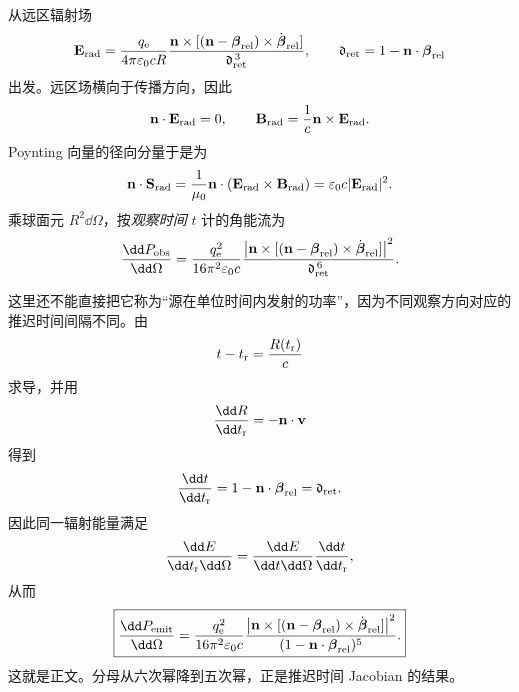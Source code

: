 \begin{derivation}[远区角通量积分与总辐射功率]

从远区辐射场
\[
\mathbf E_{\rm rad}
=
\frac{q_{\mathrm e}}{4\pi\varepsilon_0cR}
\frac{
\mathbf n\times[
(\mathbf n-\boldsymbol\beta_{\rm rel})
\times\dot{\boldsymbol\beta}_{\rm rel}]
}
{\mathfrak d_{\rm ret}^{\,3}},
\qquad
\mathfrak d_{\rm ret}
=
1-\mathbf n\cdot\boldsymbol\beta_{\rm rel}
\]
出发。远区场横向于传播方向，因此
\[
\mathbf n\cdot\mathbf E_{\rm rad}=0,
\qquad
\mathbf B_{\rm rad}
=
\frac1c\mathbf n\times\mathbf E_{\rm rad}.
\]
Poynting 向量的径向分量于是为
\[
\mathbf n\cdot\mathbf S_{\rm rad}
=
\frac1{\mu_0}
\mathbf n\cdot
(\mathbf E_{\rm rad}\times\mathbf B_{\rm rad})
=
\varepsilon_0c|\mathbf E_{\rm rad}|^2.
\]
乘球面元 \(R^2\dd\Omega\)，按\emph{观察时间} \(t\) 计的角能流为
\[
\frac{\dd P_{\rm obs}}{\dd\Omega}
=
\frac{q_{\mathrm e}^2}{16\pi^2\varepsilon_0c}
\frac{
\left|
\mathbf n\times[
(\mathbf n-\boldsymbol\beta_{\rm rel})
\times\dot{\boldsymbol\beta}_{\rm rel}]
\right|^2
}
{\mathfrak d_{\rm ret}^{\,6}}.
\]

这里还不能直接把它称为“源在单位时间内发射的功率”，因为不同观察方向对应的推迟时间间隔不同。由
\[
t-t_{\rm r}
=
\frac{R(t_{\rm r})}{c}
\]
求导，并用
\[
\frac{\dd R}{\dd t_{\rm r}}
=
-\mathbf n\cdot\mathbf v
\]
得到
\[
\frac{\dd t}{\dd t_{\rm r}}
=
1-\mathbf n\cdot\boldsymbol\beta_{\rm rel}
=
\mathfrak d_{\rm ret}.
\]
因此同一辐射能量满足
\[
\frac{\dd E}{\dd t_{\rm r}\dd\Omega}
=
\frac{\dd E}{\dd t\dd\Omega}
\frac{\dd t}{\dd t_{\rm r}},
\]
从而
\[
\boxed{
\frac{\dd P_{\rm emit}}{\dd\Omega}
=
\frac{q_{\mathrm e}^2}{16\pi^2\varepsilon_0c}
\frac{
\left|
\mathbf n\times[
(\mathbf n-\boldsymbol\beta_{\rm rel})
\times\dot{\boldsymbol\beta}_{\rm rel}]
\right|^2
}
{(1-\mathbf n\cdot\boldsymbol\beta_{\rm rel})^5}.
}
\]
这就是正文。分母从六次幂降到五次幂，正是推迟时间 Jacobian 的结果。


\end{derivation}
